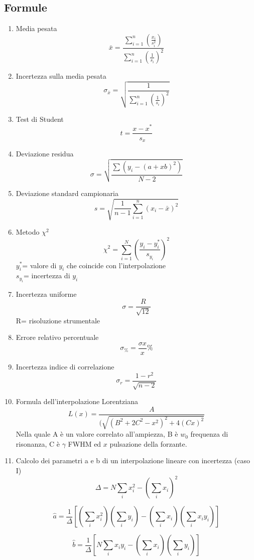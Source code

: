 \documentclass{article}
\begin{document}
\subsection{Formule}
\begin{enumerate}
    \item Media pesata
\[
\bar{x} = \frac{\sum_{i=1}^{n} (\frac{x_i}{s_i^2})}{\sum_{i=1}^{n}(\frac{1}{s_i})^2}
\]
    \item Incertezza sulla media pesata
\[
\sigma_{\bar{x}} =\sqrt{\frac{1}{\sum_{i=1}^{n}(\frac{1}{s_i})^2}}
\]
    \item Test di Student
\[
t=\frac{x-x^*}{s_x}
\]
    \item Deviazione residua 
\[
\sigma=\sqrt{\frac{\sum (y_{i}-(a+xb)^2)}{N-2}}
\]
    \item Deviazione standard campionaria
\[
s = \sqrt{\frac{1}{n-1} \sum_{i=1}^{n} (x_i-\bar{x})^2}
\]
    \item Metodo $\chi^2$
\[
\chi^2= \sum_{i=1} ^{N} (\frac{y_{i}-y_{i}^*}{s_{y_{i}}})^2    
\]$y_{i}^*$= valore di $y_{i}$ che coincide con l'interpolazione\\$s_{y_{i}}$= incertezza di $y_{i}$  
 \item Incertezza uniforme
\[
\sigma =\frac{R}{\sqrt{12}}
\]R= risoluzione strumentale

\item Errore relativo percentuale
\[
\sigma_{\%}=\frac{\sigma x}{x}\%
\]
\item Incertezza indice di correlazione
\[
\sigma_r= \frac{1 - r^2}{\sqrt{n - 2}}
\]
\item Formula dell'interpolazione Lorentziana
\[
L(x) = \frac{A}{(\sqrt{(B^2+2C^2 - x^2)^2 +4(Cx)^2}}
\] Nella quale A è un valore correlato all'ampiezza, B è $w_0$ frequenza di risonanza, C è $\gamma$ FWHM ed $x$ pulsazione della forzante.

\item Calcolo dei parametri a e b di un interpolazione lineare con incertezza (caso I)
\[
\Delta = N \sum_i x_i^2 - \left( \sum_i x_i \right)^2
\]

\[
\hat{a} = \frac{1}{\Delta} \left[ \left( \sum_i x_i^2 \right) \left( \sum_i y_i \right) - \left( \sum_i x_i \right) \left( \sum_i x_i y_i \right) \right]
\]

\[
\hat{b} = \frac{1}{\Delta} \left[ N \sum_i x_i y_i - \left( \sum_i x_i \right) \left( \sum_i y_i \right) \right]
\]


\end{enumerate}
\end{document}
